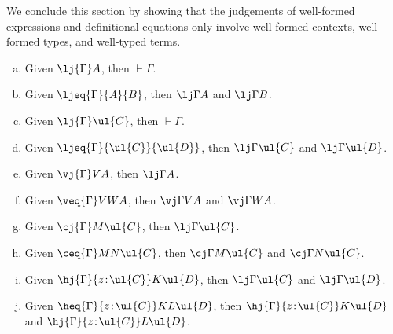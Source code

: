 We conclude this section by showing that the judgements of well-formed expressions and definitional equations only involve well-formed contexts, well-formed types, and well-typed terms.



\begin{proposition} \mbox{}
\label{prop:wellformedcomponentsofjudgements}
\begin{enumerate}[(a)]
\item Given $\lj {\Gamma} A$, then $\vdash \Gamma$.
\item Given $\ljeq {\Gamma} {A} {B}$, then $\lj \Gamma A$ and $\lj \Gamma B$.
\item Given $\lj {\Gamma} \ul{C}$, then $\vdash \Gamma$.
\item Given $\ljeq {\Gamma} {\ul{C}} {\ul{D}}$, then $\lj \Gamma \ul{C}$ and $\lj \Gamma \ul{D}$.
\item Given $\vj {\Gamma} V A$, then $\lj \Gamma A$.
\item Given $\veq {\Gamma} V W A$, then $\vj \Gamma V A$ and $\vj \Gamma W A$.
\item Given $\cj {\Gamma} M \ul{C}$, then $\lj \Gamma \ul{C}$.
\item Given $\ceq {\Gamma} M N \ul{C}$, then $\cj \Gamma M \ul{C}$ and $\cj \Gamma N \ul{C}$.
\item Given $\hj {\Gamma} {z \!:\! \ul{C}} K \ul{D}$, then $\lj \Gamma \ul{C}$ and $\lj \Gamma \ul{D}$.
\item Given $\heq {\Gamma} {z \!:\! \ul{C}} K L \ul{D}$, then $\hj {\Gamma} {z \!:\! \ul{C}} K \ul{D}$ and $\hj {\Gamma} {z \!:\! \ul{C}} L \ul{D}$.
\end{enumerate}
\end{proposition}

